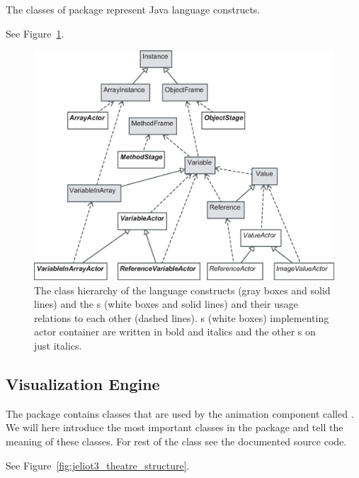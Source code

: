 The classes of  package represent Java language constructs.

See Figure~\ref{fig:language_constructs_and_actors}.

\begin{figure}[!htb]
\begin{center}
\includegraphics[width=\textwidth]{images/language_constructs_and_actors.eps}
\caption{The class hierarchy of the language constructs (gray boxes and solid lines) and the s (white boxes and solid lines) and their usage relations to each other (dashed lines). s (white boxes) implementing actor container are written in bold and italics and the other s on just italics.}
\label{fig:language_constructs_and_actors}
\end{center}
\end{figure}

\subsection{Visualization Engine}
\label{sec:Visualization_Engine}

The package  contains classes that are used by the animation
component called . We will here introduce the most important
classes in the package and tell the meaning of these classes. For rest of
the class see the documented source code.

See Figure~\ref{fig:jeliot3_theatre_structure}.

